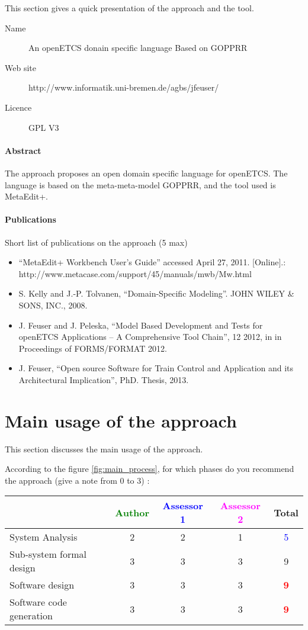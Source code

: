 This section gives a quick presentation of the approach and the tool.

\begin{description}
\item[Name] An openETCS donain specific language Based on GOPPRR
\item[Web site] http://www.informatik.uni-bremen.de/agbs/jfeuser/
\item[Licence] GPL V3
\end{description}

\paragraph{Abstract} 
The approach proposes an open  domain specific language for
openETCS. The language is based on the meta-meta-model  GOPPRR, and the
tool used is MetaEdit+.


\paragraph{Publications} Short list of publications on the approach (5 max)
\begin{itemize}
\item ``MetaEdit+ Workbench User’s Guide'' accessed April 27, 2011. [Online].:
http://www.metacase.com/support/45/manuals/mwb/Mw.html
\item S. Kelly and J.-P. Tolvanen, ``Domain-Specific Modeling''. JOHN WILEY \& SONS, INC.,
2008.
\item J. Feuser and J. Peleska, ``Model Based Development and Tests for openETCS Applications
– A Comprehensive Tool Chain'', 12 2012, in in Proceedings of FORMS/FORMAT 2012.
\item J. Feuser, ``Open source Software for Train Control and
  Application and its Architectural Implication'', PhD. Thesis, 2013.
\end{itemize}


\section{Main usage of the approach}
\label{main_usage}
This section discusses the main usage of the approach.

According to the figure \ref{fig:main_process}, for which phases do you recommend the approach (give a note from 0 to  3) :

\begin{tabular}{|l | c | c | c | c|}
\hline
& \textcolor{green}{Author} & \textcolor{blue}{Assessor 1} & \textcolor{magenta}{Assessor 2} & Total \\
\hline 
System Analysis &
2 &2 & 1    & \textcolor{blue}{5} \\
\hline
Sub-system formal design &3 &3 & 3    &  9 \\
\hline
Software design &3 &3 & 3    & \textcolor{red}{\textbf{9}} \\
\hline
Software code generation &3 &3 & 3    & \textcolor{red}{\textbf{9}} \\
\hline
\end{tabular}


